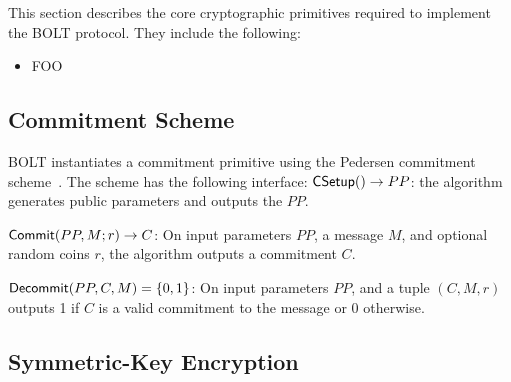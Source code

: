 \documentclass[10pt]{report}
\begin{document}
This section describes the core cryptographic primitives required to implement the BOLT protocol. They include the following:

\begin{itemize}

\item FOO



\end{itemize}

\subsection{Commitment Scheme}
\label{sec:commit}

BOLT instantiates a commitment primitive using the Pedersen commitment scheme~\cite{TODO}. The scheme has the following interface:
\medskip \noindent
${\sf CSetup}() \rightarrow PP$:  the algorithm generates public parameters and outputs the $PP$.

\medskip \noindent
${\sf Commit}(PP, M; r) \rightarrow C$: On input parameters $PP$, a message $M$, and optional random coins $r$, the algorithm outputs a commitment $C$. 

\medskip \noindent
${\sf Decommit}(PP, C, M) =  \{0, 1\}$: On input parameters $PP$, and a tuple $(C, M, r)$ outputs 1 if $C$ is a valid commitment to the message or 0 otherwise.

\subsection{Symmetric-Key Encryption}
\label{sec:authenc}
\end{document}
